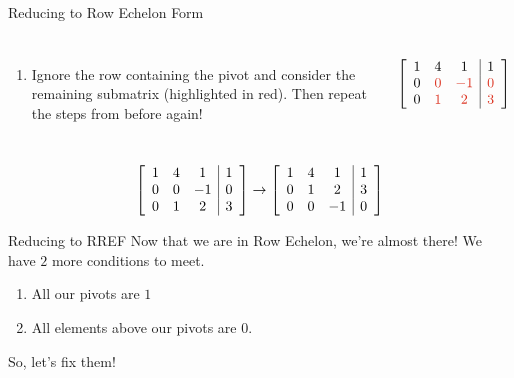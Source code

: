 \documentclass[xcoler=dvipsnames, aspectratio=169]{beamer}
\begin{document}
    \begin{frame}{Reducing to Row Echelon Form}
        \begin{columns}
            \begin{enumerate}
                \addtocounter{enumi}{3}
            \item Ignore the row containing the pivot and consider the remaining submatrix (highlighted in red). Then repeat the steps from before again!
            \end{enumerate}
            \[
                \aMat{ccc|c}{
                    1 & 4 & 1 & 1 \\
                    0 & \rText{0} & \rText{-1} & \rText{0} \\
                    0 & \rText{1} & \rText{2} & \rText{3}
                }
            \]
        \end{columns}
        \pause
        \[
            \aMat{ccc|c}{
                1 & 4 & 1 & 1 \\
                0 & 0 & -1 & 0 \\
                0 & 1 & 2 & 3
            } \rightarrow \aMat{ccc|c}{
                1 & 4 & 1 & 1 \\
                0 & 1 & 2 & 3 \\
                0 & 0 & -1 & 0 
            }
        \]
    \end{frame}
    \begin{frame}{Reducing to RREF}
        Now that we are in Row Echelon, we're almost there! We have $2$ more conditions to meet.
        \pause
        \begin{enumerate}
            \item All our pivots are $1$
            \item All elements above our pivots are $0$.
        \end{enumerate}
        \pause
        So, let's fix them!
    \end{frame}
\end{document}
